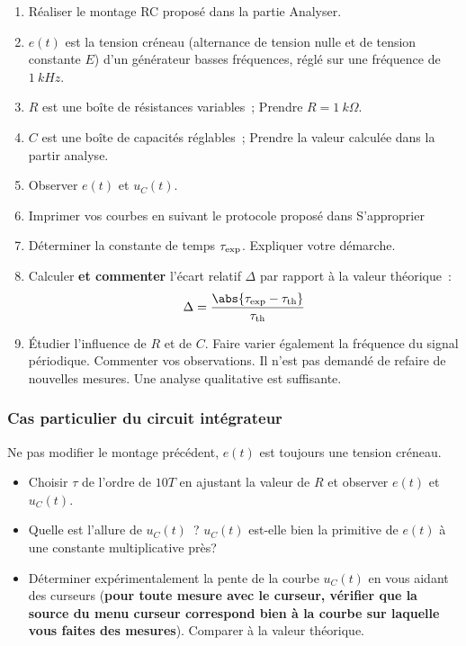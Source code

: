 \documentclass[a4paper, 11pt, final, garamond]{book}
\begin{document}
\begin{enumerate}
    \item Réaliser le montage RC proposé dans la partie Analyser.
    \item $e(t)$ est la tension créneau (alternance de tension nulle et de
        tension constante $E$) d'un générateur basses fréquences, réglé sur une
        fréquence de $\SI{1}{kHz}$.
    \item $R$ est une boîte de résistances variables~; Prendre $R =
        \SI{1}{k\Omega}$.
    \item $C$ est une boîte de capacités réglables~; Prendre la valeur calculée
        dans la partir analyse.
    \item Observer $e(t)$ et $u_{C}(t)$.
    \item Imprimer vos courbes en suivant le protocole proposé dans S'approprier
    \item Déterminer la constante de temps $\tau_{\rm exp}$. Expliquer votre
        démarche.
    \item Calculer \textbf{et commenter} l'écart relatif $\Delta$ par rapport à
        la valeur théorique~:
        \[\Delta = \frac{\abs{\tau_{\rm exp}-\tau_{\rm th}}}{\tau_{\rm th}}\]
    \item Étudier l'influence de $R$ et de $C$. Faire varier également la
        fréquence du signal périodique. Commenter vos observations. Il n'est pas
        demandé de refaire de nouvelles mesures. Une analyse qualitative est
        suffisante.
\end{enumerate}

\subsubsection{Cas particulier du circuit intégrateur}

Ne pas modifier le montage précédent, $e(t)$ est toujours une tension créneau.

\medskip

\begin{itemize}
    \item Choisir $\tau$ de l'ordre de $10 T$ en ajustant la valeur de $R$ et
        observer $e(t)$ et $u_{C}(t)$.
    \item Quelle est l'allure de $u_{C}(t)$~? $u_{C}(t)$ est-elle bien la
        primitive de $e(t)$ à une constante multiplicative près?
    \item Déterminer expérimentalement la pente de la courbe $u_{C}(t)$ en vous
        aidant des curseurs (\textbf{pour toute mesure avec le curseur, vérifier
            que la source du menu curseur correspond bien à la courbe sur
        laquelle vous faites des mesures}). Comparer à la valeur théorique.
\end{itemize}
\end{document}
